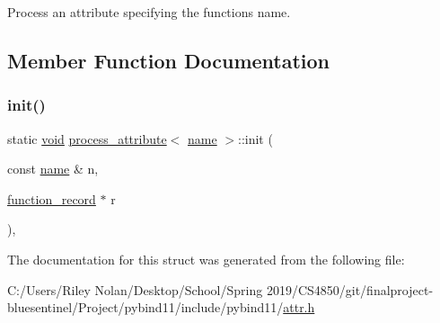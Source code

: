 Process an attribute specifying the function\textquotesingle{}s name. 

\subsection{Member Function Documentation}
\mbox{\label{structprocess__attribute_3_01name_01_4_a853a8daa0d8ef7d1980739f9785e67c1}} 
\subsubsection{\texorpdfstring{init()}{init()}}
{\footnotesize\ttfamily static \mbox{\hyperlink{_s_d_l__opengles2__gl2ext_8h_ae5d8fa23ad07c48bb609509eae494c95}{void}} \mbox{\hyperlink{structprocess__attribute}{process\+\_\+attribute}}$<$ \mbox{\hyperlink{structname}{name}} $>$\+::init (\begin{DoxyParamCaption}\item[{const \mbox{\hyperlink{structname}{name}} \&}]{n,  }\item[{\mbox{\hyperlink{structfunction__record}{function\+\_\+record}} $\ast$}]{r }\end{DoxyParamCaption})\hspace{0.3cm}{\ttfamily [inline]}, {\ttfamily [static]}}



The documentation for this struct was generated from the following file\+:\begin{DoxyCompactItemize}
\item 
C\+:/\+Users/\+Riley Nolan/\+Desktop/\+School/\+Spring 2019/\+C\+S4850/git/finalproject-\/bluesentinel/\+Project/pybind11/include/pybind11/\mbox{\hyperlink{attr_8h}{attr.\+h}}\end{DoxyCompactItemize}
